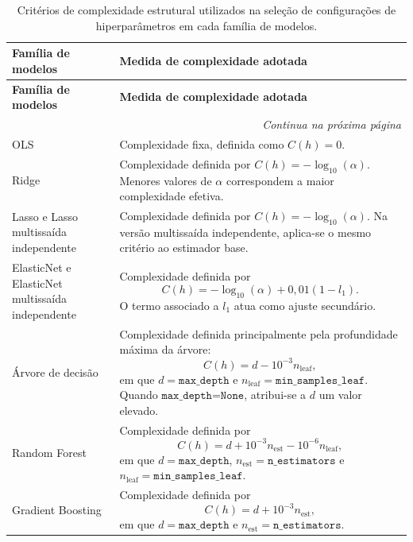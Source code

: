 \begin{longtable}{p{4.2cm} p{9.8cm}}
\caption[Critérios de complexidade estrutural utilizados na seleção de configurações]{Critérios de complexidade estrutural utilizados na seleção de configurações de hiperparâmetros em cada família de modelos.}
\label{tab:complexidade_modelos}\\

\hline
\textbf{Família de modelos} & \textbf{Medida de complexidade adotada} \\
\hline
\endfirsthead

\hline
\textbf{Família de modelos} & \textbf{Medida de complexidade adotada} \\
\hline
\endhead

\hline
\multicolumn{2}{r}{\textit{Continua na próxima página}} \\
\endfoot

\hline
\endlastfoot

OLS &
Complexidade fixa, definida como \(C(h)=0\). \\

Ridge &
Complexidade definida por \(C(h)=-\log_{10}(\alpha)\). Menores valores de \(\alpha\) correspondem a maior complexidade efetiva. \\

Lasso e Lasso multissaída independente &
Complexidade definida por \(C(h)=-\log_{10}(\alpha)\). Na versão multissaída independente, aplica-se o mesmo critério ao estimador base. \\

ElasticNet e ElasticNet multissaída independente &
Complexidade definida por
\[
C(h)=-\log_{10}(\alpha)+0{,}01(1-l_1).
\]
O termo associado a \(l_1\) atua como ajuste secundário. \\

Árvore de decisão &
Complexidade definida principalmente pela profundidade máxima da árvore:
\[
C(h)=d-10^{-3}n_{\mathrm{leaf}},
\]
em que \(d=\texttt{max\_depth}\) e \(n_{\mathrm{leaf}}=\texttt{min\_samples\_leaf}\). Quando \(\texttt{max\_depth=None}\), atribui-se a \(d\) um valor elevado. \\

Random Forest &
Complexidade definida por
\[
C(h)=d+10^{-3}n_{\mathrm{est}}-10^{-6}n_{\mathrm{leaf}},
\]
em que \(d=\texttt{max\_depth}\), \(n_{\mathrm{est}}=\texttt{n\_estimators}\) e \(n_{\mathrm{leaf}}=\texttt{min\_samples\_leaf}\). \\

Gradient Boosting &
Complexidade definida por
\[
C(h)=d+10^{-3}n_{\mathrm{est}},
\]
em que \(d=\texttt{max\_depth}\) e \(n_{\mathrm{est}}=\texttt{n\_estimators}\). \\


\end{longtable}
